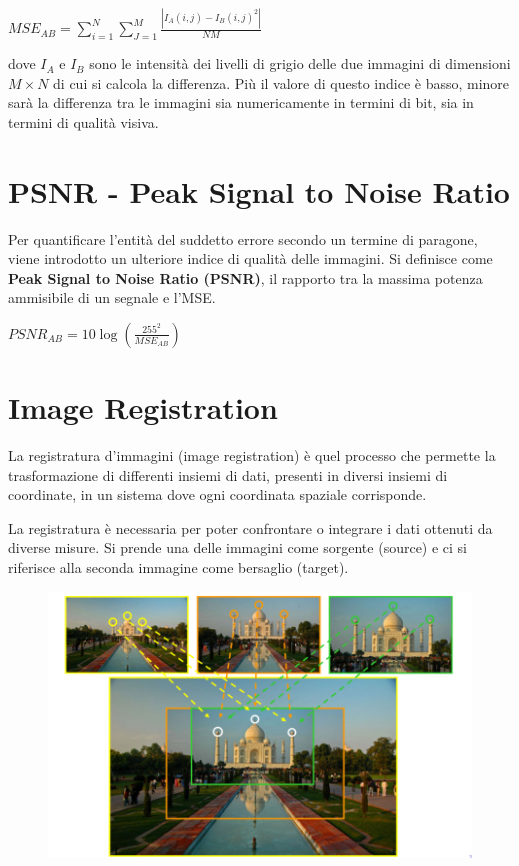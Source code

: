 \begin{center}
    $MSE_{AB} = \sum_{i=1}^{N}\sum_{J=1}^{M}\frac{|I_A(i,j)-I_B(i,j)^2|}{NM}$
\end{center}

dove $I_A$ e $I_B$ sono le intensità dei livelli di grigio delle due immagini di dimensioni $M × N$ di cui si calcola la differenza. Più il valore di questo indice è basso, minore sarà la differenza tra
le immagini sia numericamente in termini di bit, sia in termini di qualità visiva.

\section{PSNR - Peak Signal to Noise Ratio}

Per quantificare l'entità del suddetto errore secondo un termine di paragone, viene introdotto un ulteriore indice di qualità delle
immagini. Si definisce come \textbf{Peak Signal to Noise Ratio (PSNR)}, il rapporto
tra la massima potenza ammisibile di un segnale e l'MSE.

\begin{center}
    $PSNR_{AB} = 10 \log(\frac{255^2}{MSE_{AB}})$
\end{center}

\newpage
\section{Image Registration}

\begin{definition}
    La registratura d'immagini (image registration) è quel processo che permette la trasformazione di differenti insiemi di dati, presenti in diversi insiemi di coordinate, in un sistema dove ogni coordinata
    spaziale corrisponde.
\end{definition}

La registratura è necessaria per poter confrontare o integrare i dati ottenuti da diverse misure. Si prende una delle immagini come sorgente (source) e ci si
riferisce alla seconda immagine come bersaglio (target).

\begin{figure}[H]
    \centering
    \includegraphics[width=\linewidth, keepaspectratio]{capitoli/immagini/imgs/image-registration.png}
\end{figure}

